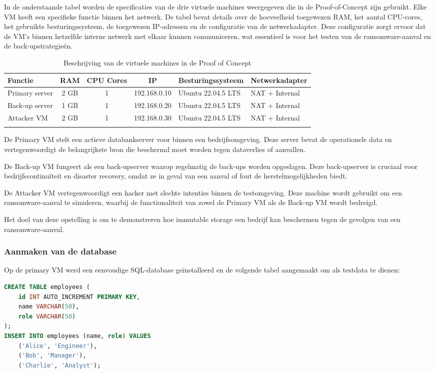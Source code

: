 In de onderstaande tabel worden de specificaties van de drie virtuele machines weergegeven die in de Proof-of-Concept zijn gebruikt. Elke VM heeft een specifieke functie binnen het netwerk. De tabel bevat details over de hoeveelheid toegewezen RAM, het aantal CPU-cores, het gebruikte besturingssysteem, de toegewezen IP-adressen en de configuratie van de netwerkadapter. Deze configuratie zorgt ervoor dat de VM's binnen hetzelfde interne netwerk met elkaar kunnen communiceren, wat essentieel is voor het testen van de ransomware-aanval en de back-upstrategieën.
\begin{longtable}{|l|c|c|c|l|l|}
    \hline
    \textbf{Functie} & \textbf{RAM} & \textbf{CPU Cores} & \textbf{IP} & \textbf{Besturingssysteem} & \textbf{Netwerkadapter} \\ \hline
    Primary server    & 2 GB         & 1                  & 192.168.0.10 & Ubuntu 22.04.5 LTS & NAT + Internal \\ \hline
    Back-up server           & 1 GB         & 1                  & 192.168.0.20 & Ubuntu 22.04.5 LTS & NAT + Internal \\ \hline
    Attacker VM         & 2 GB         & 1                  & 192.168.0.30 & Ubuntu 22.04.5 LTS     & NAT + Internal \\ \hline
    
\caption{Beschrijving van de virtuele machines in de Proof of Concept}
\end{longtable}

De Primary VM stelt een actieve databankserver voor binnen een bedrijfsomgeving. Deze server bevat de operationele data en vertegenwoordigt de belangrijkste bron die beschermd moet worden tegen dataverlies of aanvallen. 

De Back-up VM fungeert als een back-upserver waarop regelmatig de back-ups worden opgeslagen. Deze back-upserver is cruciaal voor bedrijfscontinuïteit en disaster recovery, omdat ze in geval van een aanval of fout de herstelmogelijkheden biedt. 

De Attacker VM vertegenwoordigt een hacker met slechte intenties binnen de testomgeving. Deze machine wordt gebruikt om een ransomware-aanval te simuleren, waarbij de functionaliteit van zowel de Primary VM als de Back-up VM wordt bedreigd. 

Het doel van deze opstelling is om te demonstreren hoe immutable storage een bedrijf kan beschermen tegen de gevolgen van een ransomware-aanval.
\subsubsection{Aanmaken van de database}
Op de primary VM werd een eenvoudige SQL-database geïnstalleerd en de volgende tabel aangemaakt om als testdata te dienen:
\begin{lstlisting}[language=SQL, caption={MySQL-code voor het aanmaken van de testdatabank.}]
CREATE TABLE employees (
    id INT AUTO_INCREMENT PRIMARY KEY,
    name VARCHAR(50),
    role VARCHAR(50)
);
INSERT INTO employees (name, role) VALUES 
    ('Alice', 'Engineer'), 
    ('Bob', 'Manager'), 
    ('Charlie', 'Analyst');
\end{lstlisting}



